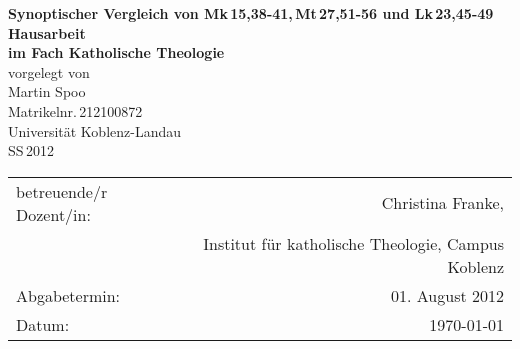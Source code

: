 \begin{titlepage}
	\begin{center}
		\quad
		\vfill
		\Huge{
			 \textbf{Synoptischer Vergleich von Mk\,15,38-41,\,Mt\,27,51-56 und Lk\,23,45-49}
		}
		\vspace{5mm}
		\vfill
		\large{
			{\bf Hausarbeit\\
			im Fach Katholische Theologie}
		}
		\\
		\vspace{0.5cm}
		\large{
			{vorgelegt von\\
			Martin Spoo\\
			Matrikelnr.\,212100872}
		}
		\vspace{1cm}
		\\
		\Large{
			{Universität Koblenz-Landau}\\
			{SS\,2012}
		}
		\vspace{1cm}
		\begin{table}[b]
			\begin{center}
				\begin{tabular}{lr}
					betreuende/r Dozent/in: & Christina Franke, \\
								&	Institut für katholische Theologie, Campus Koblenz \\
					\vspace{0.5cm}
					Abgabetermin: & 01. August 2012 \\
					Datum: & \today
				\end{tabular}
			\end{center}
		\end{table}
	\end{center}
\end{titlepage}
\renewcommand{\baselinestretch}{1.1}
\restoregeometry

